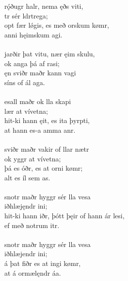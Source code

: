 \bva {}rǫ́ðugr halr, \hld nema ęðs viti, \\%
\ind {}tr sér ldrtrega; \\%
opt fær lǿgis, \hld es með orskum kømr, \\%
\ind {}anni hęimskum agi.\\%

 \\

\bva {}jarðir þat vitu, \hld nær ęim skulu, \\%
\ind ok anga þá af rasi; \\%
ęn sviðr maðr \hld kann vagi \\%
\ind síns of ál aga.\\%

 \\

\bva {}esall maðr \hld ok lla skapi \\%
\ind {}lær at vívetna; \\%
hit-ki hann ęit, \hld es ita þyrpti, \\%
\ind at hann es-a amma anr.\\%

 \\

\bva {}sviðr maðr \hld vakir of llar nætr \\%
\ind ok yggr at vívetna; \\%
þá es óðr, \hld es at orni kømr; \\%
\ind alt es íl sem as.\\%

 \\

\bva {}snotr maðr \hld hyggr sér lla vesa \\%
\ind {}iðhlæjęndr ini; \\%
hit-ki hann iðr, \hld þótt þęir of hann ár lesi, \\%
\ind ef með notrum itr.\\%

 \\

\bva {}snotr maðr \hld hyggr sér lla vesa \\%
\ind {}iðhlæjendr ini; \\%
á þat fiðr \hld es at ingi kømr, \\%
\ind at á ormælęndr áa.\\%


